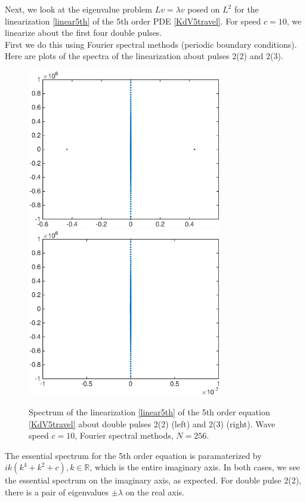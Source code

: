 \documentclass[12pt]{article}
\def\R{{\mathbb R}}
\begin{document}
Next, we look at the eigenvalue problem $Lv = \lambda v$ posed on $L^2$ for the linearization \eqref{linear5th} of the 5th order PDE \eqref{KdV5travel}. For speed $c = 10$, we linearize about the first four double pulses.\\

First we do this using Fourier spectral methods (periodic boundary conditions). Here are plots of the spectra of the linearization about pulses 2(2) and 2(3).

\begin{figure}[H]
	\includegraphics[width=8.5cm]{four10ud2_2}
	\includegraphics[width=8.5cm]{four10ud2_3}
	\caption{Spectrum of the linearization \eqref{linear5th} of the 5th order equation \eqref{KdV5travel} about double pulses 2(2) (left) and 2(3) (right). Wave speed $c = 10$, Fourier spectral methods, $N = 256$.}
\end{figure}

The essential spectrum for the 5th order equation is paramaterized by $ik(k^4 + k^2 + c), k \in \R$, which is the entire imaginary axis. In both cases, we see the essential spectrum on the imaginary axis, as expected. For double pulse 2(2), there is a pair of eigenvalues $\pm \lambda$ on the real axis.\\
\end{document}
